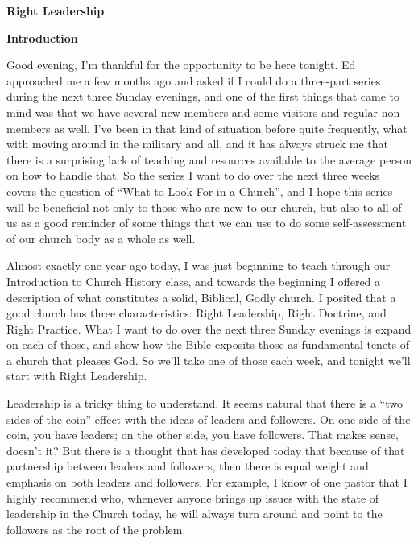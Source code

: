 \documentclass[letterpaper, 12pt]{article}
\begin{document}
    \thispagestyle{empty}

    \begin{center}

        \textbf{\large{Right Leadership}}

    \end{center}

    \noindent \textbf{Introduction}

    Good evening, I'm thankful for the opportunity to be here tonight.
    Ed approached me a few months ago and asked if I could do a
    three-part series during the next three Sunday evenings, and one of
    the first things that came to mind was that we have several new
    members and some visitors and regular non-members as well. I've been
    in that kind of situation before quite frequently, what with moving
    around in the military and all, and it has always struck me that
    there is a surprising lack of teaching and resources available to
    the average person on how to handle that. So the series I want to do
    over the next three weeks covers the question of ``What to Look For
    in a Church'', and I hope this series will be beneficial not only to
    those who are new to our church, but also to all of us as a good
    reminder of some things that we can use to do some self-assessment
    of our church body as a whole as well.

    Almost exactly one year ago today, I was just beginning to teach
    through our Introduction to Church History class, and towards the
    beginning I offered a description of what constitutes a solid,
    Biblical, Godly church. I posited that a good church has three
    characteristics: Right Leadership, Right Doctrine, and Right
    Practice. What I want to do over the next three Sunday evenings is
    expand on each of those, and show how the Bible exposits those as
    fundamental tenets of a church that pleases God. So we'll take one
    of those each week, and tonight we'll start with Right Leadership.

    Leadership is a tricky thing to understand. It seems natural that
    there is a ``two sides of the coin'' effect with the ideas of
    leaders and followers. On one side of the coin, you have leaders; on
    the other side, you have followers. That makes sense, doesn't it?
    But there is a thought that has developed today that because of that
    partnership between leaders and followers, then there is equal
    weight and emphasis on both leaders and followers. For example, I
    know of one pastor that I highly recommend who, whenever anyone
    brings up issues with the state of leadership in the Church today,
    he will always turn around and point to the followers as the root of
    the problem.
\end{document}
